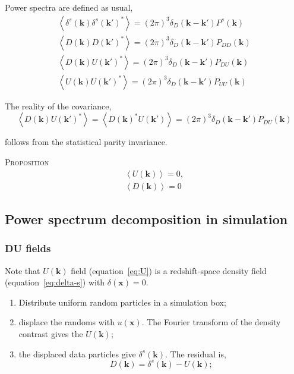 \documentclass[a4paper,11pt, fleqn]{article}
\begin{document}
\vspace{10mm}
Power spectra are defined as usual,
\begin{align}
  \left\langle \delta^s(\bm{k}) \delta^s(\bm{k}')^* \right\rangle
    = (2\pi)^3 \delta_D(\bm{k} - \bm{k}') P^s(\bm{k})\\
  \left\langle D(\bm{k}) D(\bm{k}')^* \right\rangle
    = (2\pi)^3 \delta_D(\bm{k} - \bm{k}') P_{DD}(\bm{k})\\
  \left\langle D(\bm{k}) U(\bm{k}')^* \right\rangle
    = (2\pi)^3 \delta_D(\bm{k} - \bm{k}') P_{DU}(\bm{k})\\
  \left\langle U(\bm{k}) U(\bm{k}')^* \right\rangle
    = (2\pi)^3 \delta_D(\bm{k} - \bm{k}') P_{UU}(\bm{k})
\end{align}

\vspace{10mm}
The reality of the covariance,
%
\begin{equation}
  \left\langle D(\bm{k}) U(\bm{k}')^* \right\rangle =
  \left\langle D(\bm{k})^* U(\bm{k}') \right\rangle =
  (2\pi)^3 \delta_D(\bm{k} - \bm{k}') P_{DU}(\bm{k})
\end{equation}

follows from the statistical parity invariance. 

\textsc{Proposition}
%
\begin{align}
  \left\langle U(\bm{k}) \right\rangle = 0,\\
  \left\langle D(\bm{k}) \right\rangle = 0
\end{align}


\newpage
\subsection{Power spectrum decomposition in simulation}
\subsubsection{DU fields}

Note that $U(\bm{k})$ field (equation~\ref{eq:U}) is a redshift-space
density field (equation~\ref{eq:delta-s}) with $\delta(\bm{x}) = 0$.
%
\begin{enumerate}
  \item Distribute uniform random particles in a simulation box;
  \item displace the randoms with $u(\bm{x})$. The Fourier transform
    of the density contrast gives the $U(\bm{k})$;
  \item the displaced data particles give $\delta^s(\bm{k})$. The
    residual is,
    \begin{equation}
      D(\bm{k}) = \delta^s(\bm{k}) - U(\bm{k});
    \end{equation}
\end{enumerate}
\end{document}
